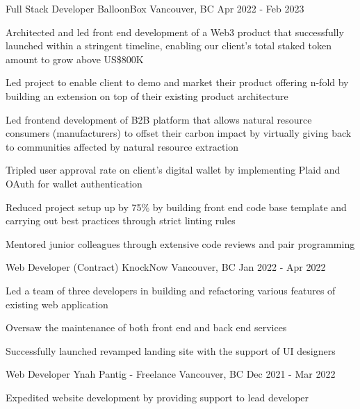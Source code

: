 
\begin{cventries}
  \cventry
    {Full Stack Developer} %
    {BalloonBox} %
    {Vancouver, BC} %
    {Apr 2022 - Feb 2023} %
    {
      \begin{cvitems} %
        \item{Architected and led front end development of a Web3 product that successfully launched within a stringent timeline, enabling our client's total staked token amount to grow above US\$800K}
        \item{Led project to enable client to demo and market their product offering n-fold by building an extension on top of their existing product architecture}
        \item{Led frontend development of B2B platform that allows natural resource consumers (manufacturers) to offset their carbon impact by virtually giving back to communities affected by natural resource extraction}
        \item{Tripled user approval rate on client’s digital wallet by implementing Plaid and OAuth for wallet authentication}
        \item{Reduced project setup up by 75\% by building front end code base template and carrying out best practices through strict linting rules}
        \item{Mentored junior colleagues through extensive code reviews and pair programming}
      \end{cvitems}
    }

  \cventry
    {Web Developer (Contract)} %
    {KnockNow} %
    {Vancouver, BC} %
    {Jan 2022 - Apr 2022} %
    {
      \begin{cvitems} %
        \item{Led a team of three developers in building and refactoring various features of existing web application}
        \item{Oversaw the maintenance of both front end and back end services}
        \item{Successfully launched revamped landing site with the support of UI designers}
      \end{cvitems}
    }

  \cventry
    {Web Developer} %
    {Ynah Pantig - Freelance} %
    {Vancouver, BC} %
    {Dec 2021 - Mar 2022} %
    {
      \begin{cvitems} %
        \item {Expedited website development by providing support to lead developer}
      \end{cvitems}
    }


\end{cventries}
